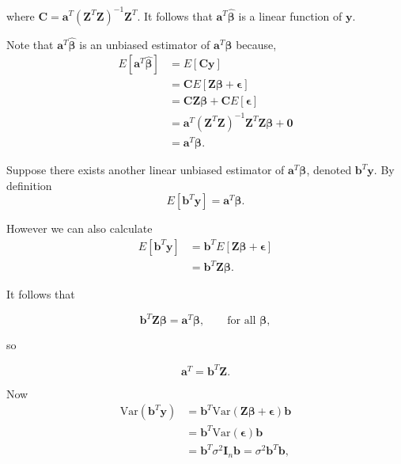 \documentclass[
]{book}
\begin{document}
where \(\mathbf{C} = \mathbf{a}^T(\mathbf{Z}^T\mathbf{Z})^{-1} \mathbf{Z}^T\). It follows that \(\mathbf{a}^T \mathbf{\hat{\beta}}\) is a linear function of \(\mathbf{y}\).

Note that \(\mathbf{a}^T \mathbf{\hat{\beta}}\) is an unbiased estimator of \(\mathbf{a}^T\mathbf{\beta}\) because,\\

\begin{align*}
E[\mathbf{a}^T \mathbf{\hat{\beta}}] &= E[\mathbf{C}\mathbf{y}] \\ 
&= \mathbf{C} E[\mathbf{Z} \mathbf{\beta} + \mathbf{\epsilon}] \\
&= \mathbf{C} \mathbf{Z} \mathbf{\beta} + \mathbf{C} E[\mathbf{\epsilon}] \\
&= \mathbf{a}^T(\mathbf{Z}^T\mathbf{Z})^{-1} \mathbf{Z}^T\mathbf{Z} \mathbf{\beta} + \mathbf{0} \\
&= \mathbf{a}^T\mathbf{\beta}.
\end{align*}

Suppose there exists another linear unbiased estimator of \(\mathbf{a}^T\mathbf{\beta}\), denoted \(\mathbf{b}^T\mathbf{y}\). By definition\\

\[E[\mathbf{b}^T\mathbf{y}] = \mathbf{a}^T \mathbf{\beta}.\]

However we can also calculate\\

\begin{align*}
E[\mathbf{b}^T\mathbf{y}] &= \mathbf{b}^T E[\mathbf{Z}\mathbf{\beta} + \mathbf{\epsilon}] \\
&= \mathbf{b}^T \mathbf{Z} \mathbf{\beta}.
\end{align*}

It follows that

\[\mathbf{b}^T \mathbf{Z} \mathbf{\beta} = \mathbf{a}^T \mathbf{\beta}, \qquad \text{for all } \mathbf{\beta},\]

so

\[\mathbf{a}^T = \mathbf{b}^T\mathbf{Z}.\]

Now\\

\begin{align*}
\text{Var}(\mathbf{b}^T\mathbf{y}) &= \mathbf{b}^T\text{Var}(\mathbf{Z}\mathbf{\beta}+\mathbf{\epsilon})\mathbf{b} \\
&= \mathbf{b}^T\text{Var}(\mathbf{\epsilon})\mathbf{b} \\
&= \mathbf{b}^T\sigma^2\mathbf{I}_n\mathbf{b} = \sigma^2 \mathbf{b}^T\mathbf{b},
\end{align*}
\end{document}

